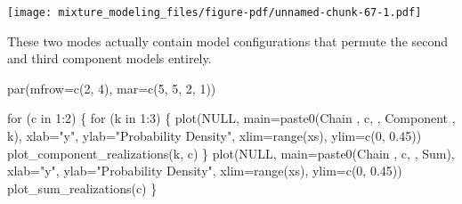 \documentclass[
  letterpaper,
  DIV=11,
  numbers=noendperiod]{scrartcl}
\newenvironment{Shaded}{\begin{snugshade}}{\end{snugshade}}
\newcommand{\AttributeTok}[1]{\textcolor[rgb]{0.40,0.45,0.13}{#1}}
\newcommand{\ConstantTok}[1]{\textcolor[rgb]{0.56,0.35,0.01}{#1}}
\newcommand{\ControlFlowTok}[1]{\textcolor[rgb]{0.00,0.23,0.31}{#1}}
\newcommand{\DecValTok}[1]{\textcolor[rgb]{0.68,0.00,0.00}{#1}}
\newcommand{\FloatTok}[1]{\textcolor[rgb]{0.68,0.00,0.00}{#1}}
\newcommand{\FunctionTok}[1]{\textcolor[rgb]{0.28,0.35,0.67}{#1}}
\newcommand{\NormalTok}[1]{\textcolor[rgb]{0.00,0.23,0.31}{#1}}
\newcommand{\SpecialCharTok}[1]{\textcolor[rgb]{0.37,0.37,0.37}{#1}}
\newcommand{\StringTok}[1]{\textcolor[rgb]{0.13,0.47,0.30}{#1}}
\begin{document}
\begin{Shaded}
\end{Shaded}

\texttt{[image: mixture\_modeling\_files/figure-pdf/unnamed-chunk-67-1.pdf]}

These two modes actually contain model configurations that permute the
second and third component models entirely.

\begin{Shaded}
\begin{Highlighting}[]
\FunctionTok{par}\NormalTok{(}\AttributeTok{mfrow=}\FunctionTok{c}\NormalTok{(}\DecValTok{2}\NormalTok{, }\DecValTok{4}\NormalTok{), }\AttributeTok{mar=}\FunctionTok{c}\NormalTok{(}\DecValTok{5}\NormalTok{, }\DecValTok{5}\NormalTok{, }\DecValTok{2}\NormalTok{, }\DecValTok{1}\NormalTok{))}

\ControlFlowTok{for}\NormalTok{ (c }\ControlFlowTok{in} \DecValTok{1}\SpecialCharTok{:}\DecValTok{2}\NormalTok{) \{}
  \ControlFlowTok{for}\NormalTok{ (k }\ControlFlowTok{in} \DecValTok{1}\SpecialCharTok{:}\DecValTok{3}\NormalTok{) \{}
    \FunctionTok{plot}\NormalTok{(}\ConstantTok{NULL}\NormalTok{, }\AttributeTok{main=}\FunctionTok{paste0}\NormalTok{(}\StringTok{\textquotesingle{}Chain \textquotesingle{}}\NormalTok{, c, }\StringTok{\textquotesingle{}, Component \textquotesingle{}}\NormalTok{, k),}
         \AttributeTok{xlab=}\StringTok{"y"}\NormalTok{, }\AttributeTok{ylab=}\StringTok{"Probability Density"}\NormalTok{,}
         \AttributeTok{xlim=}\FunctionTok{range}\NormalTok{(xs), }\AttributeTok{ylim=}\FunctionTok{c}\NormalTok{(}\DecValTok{0}\NormalTok{, }\FloatTok{0.45}\NormalTok{))}
    \FunctionTok{plot\_component\_realizations}\NormalTok{(k, c)}
\NormalTok{  \}}
  \FunctionTok{plot}\NormalTok{(}\ConstantTok{NULL}\NormalTok{, }\AttributeTok{main=}\FunctionTok{paste0}\NormalTok{(}\StringTok{\textquotesingle{}Chain \textquotesingle{}}\NormalTok{, c, }\StringTok{\textquotesingle{}, Sum\textquotesingle{}}\NormalTok{),}
       \AttributeTok{xlab=}\StringTok{"y"}\NormalTok{, }\AttributeTok{ylab=}\StringTok{"Probability Density"}\NormalTok{,}
       \AttributeTok{xlim=}\FunctionTok{range}\NormalTok{(xs), }\AttributeTok{ylim=}\FunctionTok{c}\NormalTok{(}\DecValTok{0}\NormalTok{, }\FloatTok{0.45}\NormalTok{))}
  \FunctionTok{plot\_sum\_realizations}\NormalTok{(c)}
\NormalTok{\}}
\end{Highlighting}
\end{Shaded}
\end{document}
